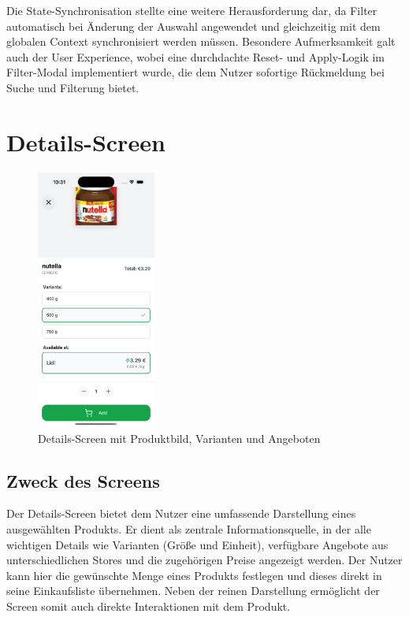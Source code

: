 Die State-Synchronisation stellte eine weitere Herausforderung dar, da Filter automatisch bei Änderung der Auswahl angewendet und gleichzeitig mit dem globalen Context synchronisiert werden müssen. Besondere Aufmerksamkeit galt auch der User Experience, wobei eine durchdachte Reset- und Apply-Logik im Filter-Modal implementiert wurde, die dem Nutzer sofortige Rückmeldung bei Suche und Filterung bietet.


\clearpage

\section{Details-Screen}

\label{sec:details_screen}
\renewcommand{\authorinitials}{DH}


\begin{figure}[H]
    \centering
    \includegraphics[width=0.35\textwidth]{media/details-screen.png}
    \caption{Details-Screen mit Produktbild, Varianten und Angeboten}
\end{figure}

\subsection{Zweck des Screens}
Der Details-Screen bietet dem Nutzer eine umfassende Darstellung eines ausgewählten Produkts. Er dient als zentrale Informationsquelle, in der alle wichtigen Details wie Varianten (Größe und Einheit), verfügbare Angebote aus unterschiedlichen Stores und die zugehörigen Preise angezeigt werden. Der Nutzer kann hier die gewünschte Menge eines Produkts festlegen und dieses direkt in seine Einkaufsliste übernehmen. Neben der reinen Darstellung ermöglicht der Screen somit auch direkte Interaktionen mit dem Produkt.

